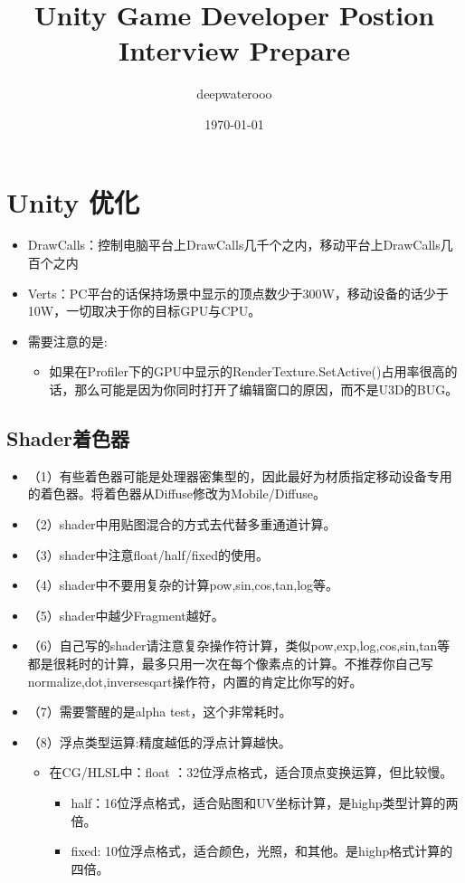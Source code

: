 \documentclass[9pt, b5paper]{article}
\author{deepwaterooo}
\date{\today}
\title{Unity Game Developer Postion Interview Prepare}
\begin{document}
\maketitle
\tableofcontents


\section{Unity 优化}
\label{sec:org415330a}
\begin{itemize}
\item DrawCalls：控制电脑平台上DrawCalls几千个之内，移动平台上DrawCalls几百个之内
\item Verts：PC平台的话保持场景中显示的顶点数少于300W，移动设备的话少于10W，一切取决于你的目标GPU与CPU。
\item 需要注意的是:
\begin{itemize}
\item 如果在Profiler下的GPU中显示的RenderTexture.SetActive()占用率很高的话，那么可能是因为你同时打开了编辑窗口的原因，而不是U3D的BUG。
\end{itemize}
\end{itemize}
\subsection{Shader着色器}
\label{sec:org633271c}
\begin{itemize}
\item （1）有些着色器可能是处理器密集型的，因此最好为材质指定移动设备专用的着色器。将着色器从Diffuse修改为Mobile/Diffuse。
\item （2）shader中用贴图混合的方式去代替多重通道计算。
\item （3）shader中注意float/half/fixed的使用。
\item （4）shader中不要用复杂的计算pow,sin,cos,tan,log等。
\item （5）shader中越少Fragment越好。
\item （6）自己写的shader请注意复杂操作符计算，类似pow,exp,log,cos,sin,tan等都是很耗时的计算，最多只用一次在每个像素点的计算。不推荐你自己写normalize,dot,inversesqart操作符，内置的肯定比你写的好。
\item （7）需要警醒的是alpha test，这个非常耗时。
\item （8）浮点类型运算:精度越低的浮点计算越快。
\begin{itemize}
\item 在CG/HLSL中：float ：32位浮点格式，适合顶点变换运算，但比较慢。
\begin{itemize}
\item half：16位浮点格式，适合贴图和UV坐标计算，是highp类型计算的两倍。
\item fixed: 10位浮点格式，适合颜色，光照，和其他。是highp格式计算的四倍。
\end{itemize}
\end{itemize}
\end{itemize}
\end{document}
